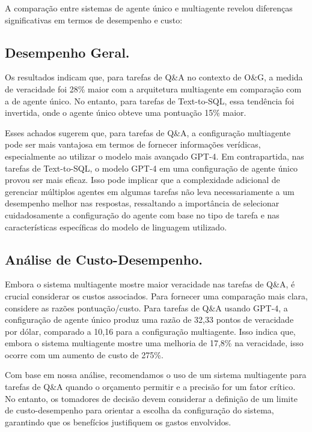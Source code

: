         A comparação entre sistemas de agente único e multiagente revelou diferenças significativas em termos de desempenho e custo:
        
        \subsection{Desempenho Geral.}     
            Os resultados indicam que, para tarefas de Q\&A no contexto de O\&G, a medida de veracidade foi 28\% maior com a arquitetura multiagente em comparação com a de agente único. No entanto, para tarefas de Text-to-SQL, essa tendência foi invertida, onde o agente único obteve uma pontuação 15\% maior.
            
            Esses achados sugerem que, para tarefas de Q\&A, a configuração multiagente pode ser mais vantajosa em termos de fornecer informações verídicas, especialmente ao utilizar o modelo mais avançado GPT-4. Em contrapartida, nas tarefas de Text-to-SQL, o modelo GPT-4 em uma configuração de agente único provou ser mais eficaz. Isso pode implicar que a complexidade adicional de gerenciar múltiplos agentes em algumas tarefas não leva necessariamente a um desempenho melhor nas respostas, ressaltando a importância de selecionar cuidadosamente a configuração do agente com base no tipo de tarefa e nas características específicas do modelo de linguagem utilizado.
            
        \subsection{Análise de Custo-Desempenho.}
        
            Embora o sistema multiagente mostre maior veracidade nas tarefas de Q\&A, é crucial considerar os custos associados. Para fornecer uma comparação mais clara, considere as razões pontuação/custo. Para tarefas de Q\&A usando GPT-4, a configuração de agente único produz uma razão de 32,33 pontos de veracidade por dólar, comparado a 10,16 para a configuração multiagente. Isso indica que, embora o sistema multiagente mostre uma melhoria de 17,8\% na veracidade, isso ocorre com um aumento de custo de 275\%.
            
            Com base em nossa análise, recomendamos o uso de um sistema multiagente para tarefas de Q\&A quando o orçamento permitir e a precisão for um fator crítico. No entanto, os tomadores de decisão devem considerar a definição de um limite de custo-desempenho para orientar a escolha da configuração do sistema, garantindo que os benefícios justifiquem os gastos envolvidos.
        

